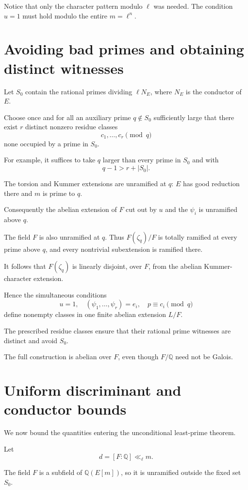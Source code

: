 \documentclass[11pt]{article}
\begin{document}
Notice that only the character pattern
modulo $\ell$ was needed. The condition
$u=1$ must hold modulo the entire
$m=\ell^n$.

\section{Avoiding bad primes and obtaining
distinct witnesses}

Let $S_0$ contain the rational primes
dividing $\ell N_E$, where $N_E$ is the
conductor of $E$.

Choose once and for all an auxiliary
prime $q\notin S_0$ sufficiently large
that there exist $r$ distinct nonzero
residue classes
\[
c_1,\ldots,c_r\pmod q
\]
none occupied by a prime in $S_0$.

For example, it suffices to take $q$
larger than every prime in $S_0$ and
with
\[
q-1>r+|S_0|.
\]

The torsion and Kummer extensions are
unramified at $q$: $E$ has good reduction
there and $m$ is prime to $q$.

Consequently the abelian extension of
$F$ cut out by $u$ and the $\psi_i$
is unramified above $q$.

The field $F$ is also unramified at $q$.
Thus $F(\zeta_q)/F$ is totally ramified
at every prime above $q$, and every
nontrivial subextension is ramified
there.

It follows that $F(\zeta_q)$ is linearly
disjoint, over $F$, from the abelian
Kummer-character extension.

Hence the simultaneous conditions
\[
\boxed{
u=1,\quad
(\psi_1,\ldots,\psi_r)=e_i,\quad
p\equiv c_i\pmod q
}
\]
define nonempty classes in one finite
abelian extension $L/F$.

The prescribed residue classes ensure
that their rational prime witnesses
are distinct and avoid $S_0$.

The full construction is abelian
over $F$, even though $F/\mathbb Q$
need not be Galois.

\section{Uniform discriminant and conductor bounds}

We now bound the quantities entering
the unconditional least-prime theorem.

Let
\[
d=[F:\mathbb Q]\ll_\ell m.
\]

The field $F$ is a subfield of
$\mathbb Q(E[m])$, so it is unramified
outside the fixed set $S_0$.
\end{document}
